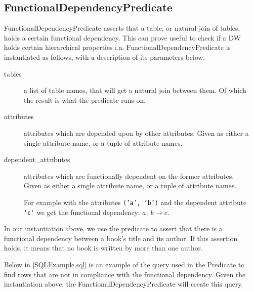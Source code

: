 \subsection{FunctionalDependencyPredicate}
FunctionalDependencyPredicate asserts that a table, or natural join of tables, holds a certain functional dependency. This can prove useful to check if a DW holds certain hierarchical properties i.a. FunctionalDependencyPredicate is instantiated as follows, with a description of its parameters below.


\begin{description}
\item [tables] a list of table names, that will get a natural join between them. Of which the result is what the predicate runs on. 
\item [attributes] attributes which are depended upon by other attributes. Given as either a single attribute name, or a tuple of attribute names.
\item [dependent\_attributes] attributes which are functionally dependent on the former attributes. Given as either a single attribute name, or a tuple of attribute names.

For example with the attributes \texttt{('a', 'b')} and the dependent attribute \texttt{'c'} we get the functional dependency: $a,\ b \rightarrow c$.
\end{description}

In our instantiation above, we use the predicate to assert that there is a functional dependency between a book's title and its author. If this assertion holds, it means that no book is written by more than one author. 

Below in \cref{SQLExample.sql} is an example of the query used in the Predicate to find rows that are not in compliance with the functional dependency. Given the instantiation above, the FunctionalDependencyPredicate will create this query. 

